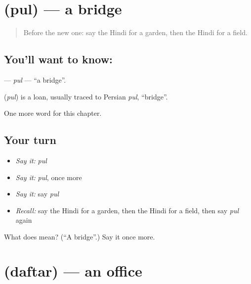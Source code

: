 \section[\texorpdfstring{\hi{पुल} (pul)}{पुल (pul)}]{ (pul) — a bridge}

\label{lesson:HI-C153-pul}



\begin{quote}
Before the new one: say the Hindi for a garden, then the Hindi for a field.
\end{quote}

\subsection*{You'll want to know: }
\textbf{} — \emph{pul} — \textquotedblleft{}a bridge\textquotedblright{}.

\begin{cousinweb}
\textbf{} (\emph{pul}) is a loan, usually traced to Persian \emph{pul}, \textquotedblleft{}bridge\textquotedblright{}.
\end{cousinweb}

\begin{grammarlens}[title={What you've built}]
One more word for this chapter.
\end{grammarlens}

\subsection*{Your turn}
\begin{itemize}
\raggedright
  \item \emph{Say it:} \emph{pul}
  \item \emph{Say it:} \emph{pul}, once more
  \item \emph{Say it:} say \emph{pul}
  \item \emph{Recall:} say the Hindi for a garden, then the Hindi for a field, then say \emph{pul} again
\end{itemize}

\begin{tcolorbox}[breakable,colback=teal!4,colframe=teal!35!black,title={Before you move on}]
What does  mean? (\textquotedblleft{}A bridge\textquotedblright{}.) Say it once more.
\end{tcolorbox}
\section[\texorpdfstring{\hi{दफ़्तर} (daftar)}{दफ़्तर (daftar)}]{ (daftar) — an office}

